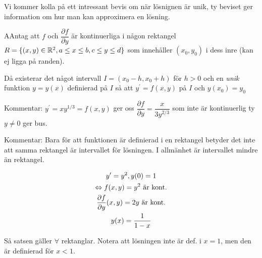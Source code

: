\noindent Vi kommer kolla på ett intressant bevis om när lösnignen är unik, ty beviset ger information om hur man kan approximera en lösning.
\par\bigskip


\begin{theo}
  AAntag att $f$ och $\dfrac{\partial f}{\partial y}$ är kontinuerliga i någon rektangel $R=\{(x,y)\in\mathbb{R}^2, a\leq x\leq b, c\leq y \leq d\}$ som innehåller $(x_0,y_0)$ i dess inre (kan ej ligga på randen).
  \par\bigskip
  \noindent Då existerar det något intervall $I=(x_0-h,x_0+h)$ för $h>0$ och en \textit{unik} funktion $y=y(x)$ definierad på $I$ så att $y^{\prime}=f(x,y)$ på $I$ och $y(x_0)=y_0$
\end{theo}
\par\bigskip

\noindent Kommentar: $y^{\prime}=xy^{1/3}=f(x,y)$ ger oss $\dfrac{\partial f}{\partial y}=\dfrac{x}{3y^{2/3}}$ som inte är kontinuerlig ty $y\neq 0$ ger bus.
\par\bigskip

\noindent Kommentar: Bara för att funktionen är definierad i en rektangel betyder det inte att samma rektangel är intervallet för lösningen. I allmänhet är intervallet mindre än rektangel.

\begin{equation*}
  \begin{gathered}
    y^{\prime}=y^2, y(0)=1\\
    \Leftrightarrow f(x,y)=y^2 \text{ är kont.}\\
    \dfrac{\partial f}{\partial y}(x,y)=2y \text{ är kont.}\\
    y(x)=\dfrac{1}{1-x}
  \end{gathered}
\end{equation*}
\par\bigskip

\noindent Så satsen gäller $\forall$ rektanglar. Notera att lösningen inte är def. i $x=1$, men den är definierad för $x<1$. 
\par\bigskip
\pagebreak

